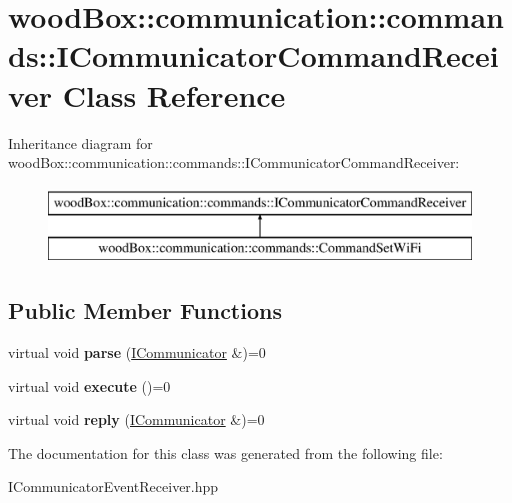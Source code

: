 \hypertarget{classwood_box_1_1communication_1_1commands_1_1_i_communicator_command_receiver}{}\section{wood\+Box\+:\+:communication\+:\+:commands\+:\+:I\+Communicator\+Command\+Receiver Class Reference}
\label{classwood_box_1_1communication_1_1commands_1_1_i_communicator_command_receiver}
Inheritance diagram for wood\+Box\+:\+:communication\+:\+:commands\+:\+:I\+Communicator\+Command\+Receiver\+:\begin{figure}[H]
\begin{center}
\leavevmode
\includegraphics[height=2.000000cm]{classwood_box_1_1communication_1_1commands_1_1_i_communicator_command_receiver}
\end{center}
\end{figure}
\subsection*{Public Member Functions}
\begin{DoxyCompactItemize}
\item 
\mbox{\label{classwood_box_1_1communication_1_1commands_1_1_i_communicator_command_receiver_a726577de1e09ad34edc9670ee8f9836f}} 
virtual void {\bfseries parse} (\mbox{\hyperlink{classwood_box_1_1communication_1_1_i_communicator}{I\+Communicator}} \&)=0
\item 
\mbox{\label{classwood_box_1_1communication_1_1commands_1_1_i_communicator_command_receiver_a071207a1c875f6a34e6954cc8195b634}} 
virtual void {\bfseries execute} ()=0
\item 
\mbox{\label{classwood_box_1_1communication_1_1commands_1_1_i_communicator_command_receiver_a268eff00d15b5c1bd7f597f8ce93b474}} 
virtual void {\bfseries reply} (\mbox{\hyperlink{classwood_box_1_1communication_1_1_i_communicator}{I\+Communicator}} \&)=0
\end{DoxyCompactItemize}


The documentation for this class was generated from the following file\+:\begin{DoxyCompactItemize}
\item 
I\+Communicator\+Event\+Receiver.\+hpp\end{DoxyCompactItemize}
